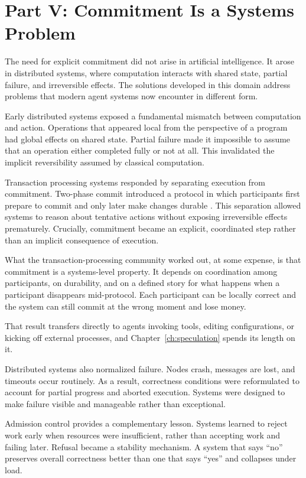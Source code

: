 \section{Part V: Commitment Is a Systems Problem}

The need for explicit commitment did not arise in artificial intelligence. It
arose in distributed systems, where computation interacts with shared state,
partial failure, and irreversible effects. The solutions developed in this domain
address problems that modern agent systems now encounter in different form.

Early distributed systems exposed a fundamental mismatch between computation and
action. Operations that appeared local from the perspective of a program had
global effects on shared state. Partial failure made it impossible to assume that
an operation either completed fully or not at all. This invalidated the implicit
reversibility assumed by classical computation.

Transaction processing systems responded by separating execution from commitment.
Two-phase commit introduced a protocol in which participants first prepare to
commit and only later make changes durable \cite{gray1978notes}. This separation
allowed systems to reason about tentative actions without exposing irreversible
effects prematurely. Crucially, commitment became an explicit, coordinated step
rather than an implicit consequence of execution.

What the transaction-processing community worked out, at some expense, is that
commitment is a systems-level property. It depends on coordination among
participants, on durability, and on a defined story for what happens when a
participant disappears mid-protocol. Each participant can be locally correct and
the system can still commit at the wrong moment and lose money.

That result transfers directly to agents invoking tools, editing configurations, or
kicking off external processes, and Chapter~\ref{ch:speculation} spends its length
on it.

Distributed systems also normalized failure. Nodes crash, messages are lost, and
timeouts occur routinely. As a result, correctness conditions were reformulated to
account for partial progress and aborted execution. Systems were designed to make
failure visible and manageable rather than exceptional.

Admission control provides a complementary lesson. Systems learned to reject work
early when resources were insufficient, rather than accepting work and failing
later. Refusal became a stability mechanism. A system that says “no” preserves
overall correctness better than one that says “yes” and collapses under load.


